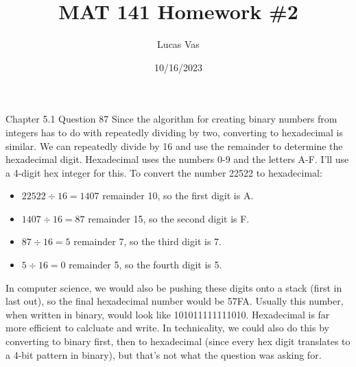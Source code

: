 \documentclass[11pt]{article}
\title{MAT 141 Homework \#2}
\author{Lucas Vas}
\date{10/16/2023}  %
\begin{document}
\markboth{\theauthor}{\thetitle}

\maketitle


    \begin{problem}{Chapter 5.1 Question 87}
        Since the algorithm for creating binary numbers from integers has to do with repeatedly
        dividing by two, converting to hexadecimal is similar. We can repeatedly divide by 16 and
        use the remainder to determine the hexadecimal digit. Hexadecimal uses the numbers 0-9 and
        the letters A-F. I'll use a 4-digit hex integer for this. To convert the number
        22522 to hexadecimal:
        \begin{itemize}
            \item[] $22522 \div 16 = 1407$ remainder 10, so the first digit is A.
            \item[] $1407 \div 16 = 87$ remainder 15, so the second digit is F.
            \item[] $87 \div 16 = 5$ remainder 7, so the third digit is 7.
            \item[] $5 \div 16 = 0$ remainder 5, so the fourth digit is 5.
        \end{itemize}
        In computer science, we would also be pushing these digits onto a stack (first in last out),
        so the final hexadecimal number would be 57FA. Usually this number, when written in binary,
        would look like 101011111111010. Hexadecimal is far more efficient to calcluate and write.
        In technicality, we could also do this by converting to binary first, then to hexadecimal
        (since every hex digit translates to a 4-bit pattern in binary), but that's not what the
        question was asking for.
    \end{problem}
\end{document}

